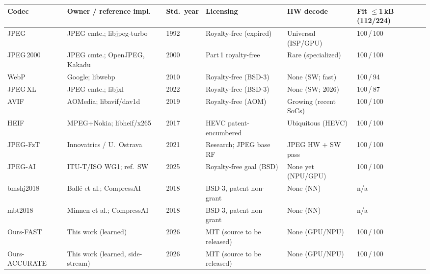 \begin{tabular}{@{}llllll@{}}
\toprule
Codec & Owner / reference impl. & Std.\ year & Licensing & HW decode & Fit $\le$1\,kB (112/224) \\
\midrule
JPEG        & JPEG cmte.; libjpeg-turbo            & 1992 & Royalty-free (expired)        & Universal (ISP/GPU)      & 100\,/\,100 \\
JPEG\,2000  & JPEG cmte.; OpenJPEG, Kakadu         & 2000 & Part\,1 royalty-free          & Rare (specialized)       & 100\,/\,100 \\
WebP        & Google; libwebp                      & 2010 & Royalty-free (BSD-3)          & None (SW; fast)          & 100\,/\,94  \\
JPEG\,XL    & JPEG cmte.; libjxl                   & 2022 & Royalty-free (BSD-3)          & None (SW; 2026)          & 100\,/\,87  \\
AVIF        & AOMedia; libavif/dav1d               & 2019 & Royalty-free (AOM)            & Growing (recent SoCs)    & 100\,/\,100 \\
HEIF        & MPEG+Nokia; libheif/x265             & 2017 & HEVC patent-encumbered        & Ubiquitous (HEVC)        & 100\,/\,100 \\
JPEG-FzT    & Innovatrics / U.\ Ostrava            & 2021 & Research; JPEG base RF        & JPEG HW + SW pass        & 100\,/\,100 \\
JPEG-AI     & ITU-T/ISO WG1; ref.\ SW              & 2025 & Royalty-free goal (BSD)       & None yet (NPU/GPU)       & 100\,/\,100 \\
bmshj2018   & Ball\'e et al.; CompressAI           & 2018 & BSD-3, patent non-grant       & None (NN)                & n/a         \\
mbt2018     & Minnen et al.; CompressAI            & 2018 & BSD-3, patent non-grant       & None (NN)                & n/a         \\
\midrule
Ours-FAST      & This work (learned)               & 2026 & MIT (source to be released)   & None (GPU/NPU)           & 100\,/\,100 \\
Ours-ACCURATE  & This work (learned, side-stream)  & 2026 & MIT (source to be released)   & None (GPU/NPU)           & 100\,/\,100 \\
\bottomrule
\end{tabular}
